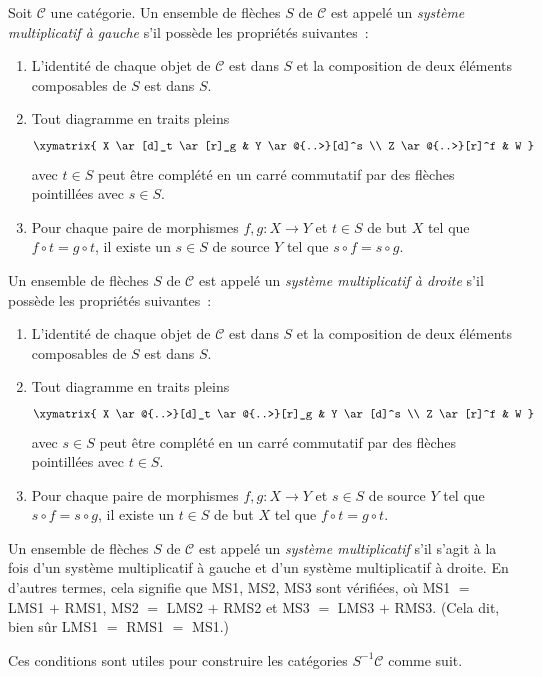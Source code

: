 \begin{definition}
\label{definition-multiplicative-system}
Soit $\mathcal{C}$ une catégorie. Un ensemble de flèches $S$ de $\mathcal{C}$
est appelé un {\it système multiplicatif à gauche} s'il possède les propriétés
suivantes :
\begin{enumerate}
\item[LMS1] L'identité de chaque objet de $\mathcal{C}$ est dans $S$ et la
composition de deux éléments composables de $S$ est dans $S$.
\item[LMS2] Tout diagramme en traits pleins
$$
\xymatrix{
X \ar[d]_t \ar[r]_g & Y \ar@{..>}[d]^s \\
Z \ar@{..>}[r]^f & W
}
$$
avec $t \in S$ peut être complété en un carré commutatif par des flèches pointillées avec $s \in S$.
\item[LMS3] Pour chaque paire de morphismes $f, g : X \to Y$ et $t \in S$ de
but $X$ tel que $f \circ t = g \circ t$, il existe un $s \in S$ de
source $Y$ tel que $s \circ f = s \circ g$.
\end{enumerate}
Un ensemble de flèches $S$ de $\mathcal{C}$ est appelé un {\it système
multiplicatif à droite} s'il possède les propriétés suivantes :
\begin{enumerate}
\item[RMS1] L'identité de chaque objet de $\mathcal{C}$ est dans $S$ et la
composition de deux éléments composables de $S$ est dans $S$.
\item[RMS2] Tout diagramme en traits pleins
$$
\xymatrix{
X \ar@{..>}[d]_t \ar@{..>}[r]_g & Y \ar[d]^s \\
Z \ar[r]^f & W
}
$$
avec $s \in S$ peut être complété en un carré commutatif par des flèches pointillées avec $t \in S$.
\item[RMS3] Pour chaque paire de morphismes $f, g : X \to Y$ et $s \in S$ de
source $Y$ tel que $s \circ f = s \circ g$, il existe un $t \in S$ de
but $X$ tel que $f \circ t = g \circ t$.
\end{enumerate}
Un ensemble de flèches $S$ de $\mathcal{C}$ est appelé un {\it système
multiplicatif} s'il s'agit à la fois d'un système multiplicatif à gauche et d'un
système multiplicatif à droite. En d'autres termes, cela signifie que MS1, MS2,
MS3 sont vérifiées, où MS1 $=$ LMS1 $+$ RMS1, MS2 $=$ LMS2 $+$ RMS2 et MS3 $=$
LMS3 $+$ RMS3. (Cela dit, bien sûr LMS1 $=$ RMS1 $=$ MS1.)
\end{definition}

\noindent
Ces conditions sont utiles pour construire les catégories $S^{-1}\mathcal{C}$
comme suit.

